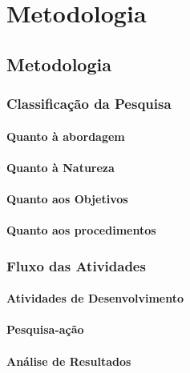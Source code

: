 \chapter[Metodologia]{Metodologia}

\section{Metodologia}

\subsection{Classificação da Pesquisa}

\subsubsection{Quanto à abordagem}

\subsubsection{Quanto à Natureza}

\subsubsection{Quanto aos Objetivos}

\subsubsection{Quanto aos procedimentos}

\subsection{Fluxo das Atividades}

\subsubsection{Atividades de Desenvolvimento}

\subsubsection{Pesquisa-ação}

\subsubsection{Análise de Resultados}

